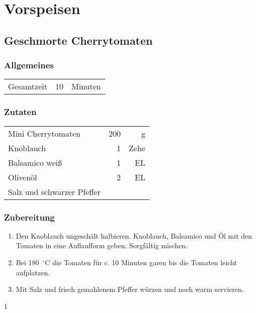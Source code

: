 \chapter{Vorspeisen}

\section{Geschmorte Cherrytomaten}  
\subsection*{Allgemeines}
\begin{tabular}{lrl}
	Gesamtzeit          &  10 & Minuten 
\end{tabular} 
\subsection*{Zutaten}
\begin{tabular}{lrr}
	Mini Cherrytomaten        & 200 &    g \\
	Knoblauch                 &   1 & Zehe \\
	Balsamico weiß            &   1 &   EL \\
	Olivenöl                  &   2 &   EL \\
	Salz und schwarzer Pfeffer &     &
\end{tabular} 

\subsection*{Zubereitung}

\begin{enumerate}
	\item Den Knoblauch ungeschält halbieren. Knoblauch, Balsamico und Öl mit den Tomaten in eine Auflaufform geben. Sorgfältig mischen.  
	\item Bei 180~$^\circ$C die Tomaten für c. 10 Minuten garen bis die Tomaten leicht aufplatzen.
	\item Mit Salz und frisch gemahlenem Pfeffer würzen und noch warm servieren.  
\end{enumerate}1  

